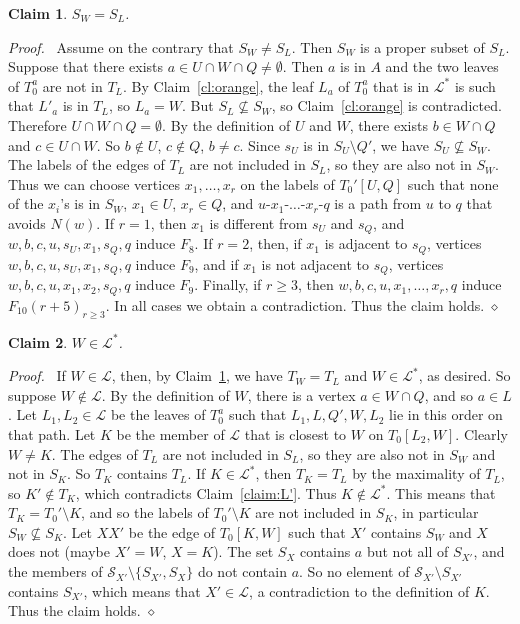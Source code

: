 \documentclass[11pt]{article}
\newtheorem{claim}{Claim}
\newenvironment{proofcl}{\noindent \emph{Proof.}\ }{Thus the claim
holds.  \hfill $\diamond$\vspace{1em}}
\begin{document}
\begin{claim}
\label{claim:egal}
    $S_W=S_L$.
\end{claim}
\begin{proofcl}
Assume on the contrary that $S_W\neq S_L$.  Then $S_W$ is a proper
subset of $S_L$.  Suppose that there exists $a\in U\cap W\cap
Q\neq\emptyset$.  Then $a$ is in $A$ and the two leaves of $T_0^{a}$
are not in $T_L$.  By Claim~\ref{cl:orange}, the leaf $L_{a}$ of
$T_0^{a}$ that is in $\mathcal L^*$ is such that $L'_{a}$ is in $T_L$,
so $L_{a}=W$.  But $S_L\nsubseteq S_W$, so Claim~\ref{cl:orange} is
contradicted.  Therefore $U\cap W\cap Q= \emptyset$.  By the
definition of $U$ and $W$, there exists $b\in W\cap Q$ and $c\in U\cap
W$.  So $b\notin U$, $c\notin Q$, $b\neq c$.  Since $s_U$ is in $S_U
\setminus Q'$, we have $S_U\nsubseteq S_W$.  The labels of the edges
of $T_L$ are not included in $S_L$, so they are also not in $S_W$.
Thus we can choose vertices $x_1, \ldots, x_r$ on the labels of
$T_0'[U, Q]$ such that none of the $x_i$'s is in $S_W$, $x_1\in U$,
$x_r\in Q$, and $u$-$x_1$-$\ldots$-$x_r$-$q$ is a path from $u$ to $q$
that avoids $N(w)$.  If $r=1$, then $x_1$ is different from $s_U$ and
$s_Q$, and $w, b, c, u, s_U, x_1, s_Q, q$ induce $F_8$.  If $r=2$,
then, if $x_1$ is adjacent to $s_Q$, vertices $w, b, c, u, s_U, x_1,
s_Q, q$ induce $F_9$, and if $x_1$ is not adjacent to $s_Q$, vertices
$w, b, c, u, x_1, x_2, s_Q, q$ induce $F_9$.  Finally, if $r\geq 3$,
then $w, b, c, u, x_1, \ldots, x_r, q$ induce $F_{10}(r+5)_{r\geq 3}$.
In all cases we obtain a contradiction.
\end{proofcl}



\begin{claim}
\label{claim:W}
$W\in \mathcal L^*$.
\end{claim}

\begin{proofcl}
If $W\in \mathcal L$, then, by Claim~\ref{claim:egal}, we have
$T_W=T_L$ and $W\in \mathcal L^*$, as desired.  So suppose $W\notin
\mathcal L$.  By the definition of $W$, there is a vertex $a\in W\cap
Q$, and so $a\in L$.  Let $L_1, L_2\in \mathcal L$ be the leaves of
$T_0^a$ such that $L_1, L, Q', W, L_2$ lie in this order on that path.
Let $K$ be the member of $\mathcal L$ that is closest to $W$ on
$T_0[L_2, W]$.  Clearly $W\neq K$.  The edges of $T_L$ are not
included in $S_L$, so they are also not in $S_W$ and not in $S_{K}$.
So $T_{K}$ contains $T_L$.  If $K\in \mathcal L^*$, then $T_{K}=T_L$
by the maximality of $T_L$, so $K'\notin T_K$, which contradicts
Claim~\ref{claim:L'}.  Thus $K\notin \mathcal L^*$.  This means that
$T_{K}= T_0'\setminus K$, and so the labels of $T_0'\setminus K$ are
not included in $S_{K}$, in particular $S_W\nsubseteq S_{K}$.  Let
$XX'$ be the edge of $T_0[K, W]$ such that $X'$ contains $S_W$ and $X$
does not (maybe $X'=W$, $X=K$).  The set $S_X$ contains $a$ but not
all of $S_{X'}$, and the members of $\mathcal S_{X'}\setminus
\{S_{X'}, S_X\}$ do not contain $a$.  So no element of $\mathcal
S_{X'}\setminus S_{X'}$ contains $S_{X'}$, which means that $X'\in
\mathcal L$, a contradiction to the definition of $K$.
\end{proofcl}
\end{document}
